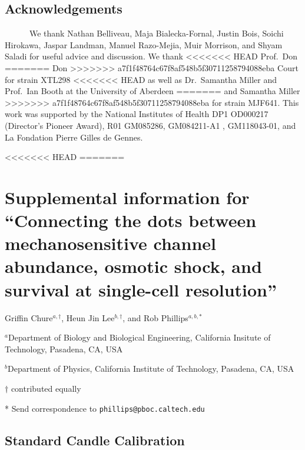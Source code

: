 \subsection{Acknowledgements}\label{acknowledgements}

~ ~ ~
~We
thank
Nathan
Belliveau,
Maja
Bialecka-Fornal,
Justin
Bois,
Soichi
Hirokawa,
Jaspar
Landman,
Manuel
Razo-Mejia,
Muir
Morrison,
and
Shyam
Saladi
for
useful
advice
and
discussion.
We
thank
<<<<<<< HEAD
Prof.~Don
=======
Don
>>>>>>> a7f1f48764c67f8af548b5f30711258794088eba
Court
for
strain
XTL298
<<<<<<< HEAD
as
well
as
Dr.~Samantha
Miller
and
Prof.~Ian
Booth
at the
University
of
Aberdeen
=======
and
Samantha
Miller
>>>>>>> a7f1f48764c67f8af548b5f30711258794088eba
for
strain
MJF641.
This
work
was
supported
by the
National
Institutes
of
Health
DP1
OD000217
(Director's
Pioneer
Award),
R01
GM085286,
GM084211-A1
,
GM118043-01,
and La
Fondation
Pierre
Gilles
de
Gennes.

<<<<<<< HEAD
=======
\section{\texorpdfstring{Supplemental
information
for
``Connecting
the
dots
between
mechanosensitive
channel
abundance,
osmotic
shock,
and
survival
at
single-cell
resolution''}{Supplemental information for Connecting the dots between mechanosensitive channel abundance, osmotic shock, and survival at single-cell resolution}}\label{supplemental-information-for-connecting-the-dots-between-mechanosensitive-channel-abundance-osmotic-shock-and-survival-at-single-cell-resolution}

Griffin
Chure\(^{a, \dagger}\),
Heun
Jin
Lee\(^{b, \dagger}\),
and
Rob
Phillips\(^{a,b, *}\)

\(^a\)Department
of
Biology
and
Biological
Engineering,
California
Insitute
of
Technology,
Pasadena,
CA,
USA

\(^b\)Department
of
Physics,
California
Institute
of
Technology,
Pasadena,
CA,
USA

\(\dagger\)
contributed
equally

* Send
correspondence
to
\texttt{phillips@pboc.caltech.edu}

\subsection{Standard
Candle
Calibration}\label{standard-candle-calibration}

